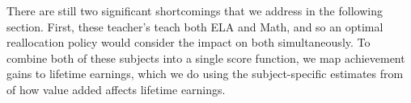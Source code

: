 \documentclass[12pt]{article}
\theoremstyle{definition}
\theoremstyle{definition}
\theoremstyle{definition}
\theoremstyle{definition}
\begin{document}
There are still two significant shortcomings that we address in the following section. First, these teacher's teach both ELA and Math, and so an optimal reallocation policy would consider the impact on both simultaneously. To combine both of these subjects into a single score function, we map achievement gains to lifetime earnings, which we do using the subject-specific estimates from \citet{chetty2014measuring1} of how value added affects lifetime earnings.




%
\end{document}

